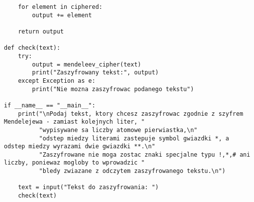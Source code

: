 \documentclass[12pt,a4paper]{article}
\begin{document}
\begin{lstlisting}
    for element in ciphered:
        output += element

    return output

def check(text):
    try:
        output = mendeleev_cipher(text)
        print("Zaszyfrowany tekst:", output)
    except Exception as e:
        print("Nie mozna zaszyfrowac podanego tekstu")

if __name__ == "__main__":
    print("\nPodaj tekst, ktory chcesz zaszyfrowac zgodnie z szyfrem Mendelejewa - zamiast kolejnych liter, "
          "wypisywane sa liczby atomowe pierwiastka,\n"
          "odstep miedzy literami zastepuje symbol gwiazdki *, a odstep miedzy wyrazami dwie gwiazdki **.\n"
          "Zaszyfrowane nie moga zostac znaki specjalne typu !,*,# ani liczby, poniewaz mogloby to wprowadzic "
          "bledy zwiazane z odczytem zaszyfrowanego tekstu.\n")

    text = input("Tekst do zaszyfrowania: ")
    check(text)

\end{lstlisting}
\newpage
\end{document}
